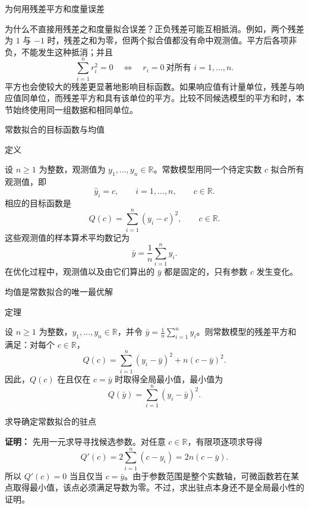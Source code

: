\documentclass[aspectratio=169,10pt,fontset=fandol]{ctexbeamer}
\begin{document}
\begin{frame}[t,fragile]{为何用残差平方和度量误差}
\footnotesize
{\footnotesize
为什么不直接用残差之和度量拟合误差？正负残差可能互相抵消。例如，两个残差为 $1$ 与 $-1$ 时，残差之和为零，但两个拟合值都没有命中观测值。平方后各项非负，不能发生这种抵消；并且
\[
\sum_{i=1}^{n}r_i^2=0\quad\Longleftrightarrow\quad r_i=0\ \text{对所有 }i=1,\ldots,n.
\]
平方也会使较大的残差更显著地影响目标函数。如果响应值有计量单位，残差与响应值同单位，而残差平方和具有该单位的平方。比较不同候选模型的平方和时，本节始终使用同一组数据和相同单位。\par

}
\end{frame}
\begin{frame}[t,fragile]{常数拟合的目标函数与均值}
\footnotesize
\begin{block}{定义}
{\footnotesize
设 $n\geq1$ 为整数，观测值为 $y_1,\ldots,y_n\in\mathbb{R}$。常数模型用同一个待定实数 $c$ 拟合所有观测值，即
\[
\hat{y}_i=c,\qquad i=1,\ldots,n,\qquad c\in\mathbb{R}.
\]
相应的目标函数是
\[
Q(c)=\sum_{i=1}^{n}(y_i-c)^2,\qquad c\in\mathbb{R}.
\]
这些观测值的样本算术平均数记为
\[
\bar{y}=\frac{1}{n}\sum_{i=1}^{n}y_i.
\]
在优化过程中，观测值以及由它们算出的 $\bar{y}$ 都是固定的，只有参数 $c$ 发生变化。

}
\end{block}
\end{frame}
\begin{frame}[t,fragile]{均值是常数拟合的唯一最优解}
\footnotesize
\begin{block}{定理}
{\footnotesize
设 $n\geq1$ 为整数，$y_1,\ldots,y_n\in\mathbb{R}$，并令 $\bar{y}=\frac{1}{n}\sum_{i=1}^{n}y_i$。则常数模型的残差平方和满足：对每个 $c\in\mathbb{R}$，
\[
Q(c)=\sum_{i=1}^{n}(y_i-\bar{y})^2+n(c-\bar{y})^2.
\]
因此，$Q(c)$ 在且仅在 $c=\bar{y}$ 时取得全局最小值，最小值为
\[
Q(\bar{y})=\sum_{i=1}^{n}(y_i-\bar{y})^2.
\]

}
\end{block}
\end{frame}
\begin{frame}[t,fragile]{求导确定常数拟合的驻点}
\footnotesize
{\footnotesize
\textbf{证明：}
先用一元求导寻找候选参数。对任意 $c\in\mathbb{R}$，有限项逐项求导得
\[
Q'(c)=2\sum_{i=1}^{n}(c-y_i)=2n(c-\bar{y}).
\]
所以 $Q'(c)=0$ 当且仅当 $c=\bar{y}$。由于参数范围是整个实数轴，可微函数若在某点取得最小值，该点必须满足导数为零。不过，求出驻点本身还不是全局最小性的证明。


}
\end{frame}
\end{document}
